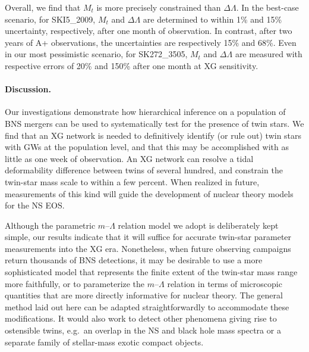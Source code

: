 \documentclass[aps,prl,twocolumn,superscriptaddress,footinbib]{revtex4-1}
\begin{document}
Overall, we find that $M_t$ is more precisely constrained than $\Delta\Lambda$. In the best-case scenario, for SKI5\_2009, $M_t$ and $\Delta\Lambda$ are determined to within 1\% and 15\% uncertainty, respectively, after one month of observation. In contrast, after two years of A+ observations, the uncertainties are respectively 15\% and 68\%. Even in our most pessimistic scenario, for SK272\_3505, $M_t$ and $\Delta\Lambda$ are measured with respective errors of 20\% and 150\% after one month at XG sensitivity. 

\paragraph{Discussion.}

Our investigations demonstrate how hierarchical inference on a population of BNS mergers can be used to systematically test for the presence of twin stars. We find that an XG network is needed to definitively identify (or rule out) twin stars with GWs at the population level, and that this may be accomplished with as little as one week of observation. An XG network can resolve a tidal deformability difference between twins of several hundred, and constrain the twin-star mass scale to within a few percent. When realized in future, measurements of this kind will guide the development of nuclear theory models for the NS EOS.

Although the parametric $m$--$\Lambda$ relation model we adopt is deliberately kept simple, our results indicate that it will suffice for accurate twin-star parameter measurements into the XG era. Nonetheless, when future observing campaigns return thousands of BNS detections, it may be desirable to use a more sophisticated model that represents the finite extent of the twin-star mass range more faithfully, or to parameterize the $m$--$\Lambda$ relation in terms of microscopic quantities that are more directly informative for nuclear theory.  
The general method laid out here can be adapted straightforwardly to accommodate these modifications. It would also work to detect other phenomena giving rise to ostensible twins, e.g.~an overlap in the NS and black hole mass spectra or a separate family of stellar-mass exotic compact objects.
\end{document}
